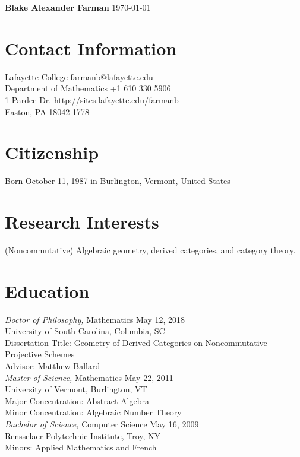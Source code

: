 \documentclass{article}
\begin{document}
\noindent\textbf{\large{Blake Alexander Farman}} \hfill \today\\
\noindent\makebox[\linewidth]{\rule{\textwidth}{0.4pt}}

\section*{Contact Information}
  Lafayette College \hfill farmanb@lafayette.edu\\
  Department of Mathematics \hfill +1 610 330 5906\\
  1 Pardee Dr. \hfill \hyperref[http://sites.lafayette.edu/farmanb]{http://sites.lafayette.edu/farmanb}\\
  Easton, PA 18042-1778

  \section*{Citizenship}
  Born October 11, 1987 in Burlington, Vermont, United States

  \section*{Research Interests}
  (Noncommutative) Algebraic geometry, derived categories, and category theory.

  \section*{Education} 
  \textsl{Doctor of Philosophy,} Mathematics \hfill  May 12, 2018\\
  University of South Carolina, Columbia, SC\\
  Dissertation Title: Geometry of Derived Categories on Noncommutative Projective Schemes\\
  Advisor: Matthew Ballard\\
  
  \noindent
  \textsl{Master of Science,} Mathematics \hfill May 22, 2011\\
  University of Vermont, Burlington, VT\\
  Major Concentration: Abstract Algebra\\
  Minor Concentration: Algebraic Number Theory\\
  
  \noindent\textsl{Bachelor of Science,} Computer Science \hfill May 16, 2009\\
  Rensselaer Polytechnic Institute, Troy, NY\\
  Minors: Applied Mathematics and French
  
\end{document}
